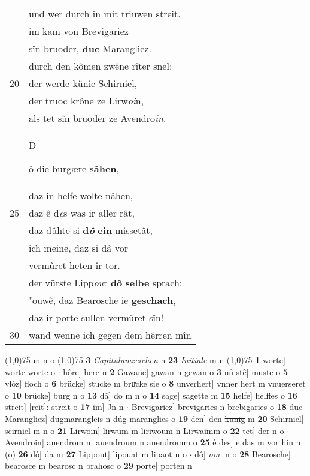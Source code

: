 \documentclass[8pt,a4paper,notitlepage]{article}
\begin{document}
\begin{table}[ht]
\begin{minipage}[t]{0.5\linewidth}
\begin{tabular}{rl}
 & und wer durch in mit triuwen streit.\\ 
 & im kam von Brevigariez\\ 
 & sîn bruoder, \textbf{duc} Marangliez.\\ 
 & durch den kômen zwêne rîter snel:\\ 
20 & der werde künic Schirniel,\\ 
 & der truoc krône ze Lirw\textit{oi}n,\\ 
 & als tet sîn bruoder ze Avendro\textit{in}.\\ 
 & \begin{large}D\end{large}ô die burgære \textbf{sâhen},\\ 
 & daz in helfe wolte nâhen,\\ 
25 & daz ê d\textit{e}s was ir aller rât,\\ 
 & daz dûhte si \textbf{d\textit{ô}} \textbf{ein} missetât,\\ 
 & ich meine, daz si dâ vor\\ 
 & vermûret heten ir tor.\\ 
 & der vürste Lipp\textit{ou}t \textbf{dô} \textbf{selbe} sprach:\\ 
 & "ouwê, daz Bearosche ie \textbf{geschach},\\ 
 & daz ir porte sullen vermûret sîn!\\ 
30 & wand wenne ich gegen dem hêrren mîn\\ 
\end{tabular}
\scriptsize
\line(1,0){75} \newline
m n o \newline
\line(1,0){75} \newline
\textbf{3} \textit{Capitulumzeichen} n  \textbf{23} \textit{Initiale} m n  \newline
\line(1,0){75} \newline
\textbf{1} worte] worte worte o  $\cdot$ hôre] here n \textbf{2} Gawane] gawan n gewan o \textbf{3} nû stê] muste o \textbf{5} vlôz] floch o \textbf{6} brücke] stucke m bruͯcke sie o \textbf{8} unverhert] vnner hert m vnuerseret o \textbf{10} brücke] burg n o \textbf{13} dâ] do m n o \textbf{14} sage] sagette m \textbf{15} helfe] helffes o \textbf{16} streit] [reit]: streit o \textbf{17} im] Jn n  $\cdot$ Brevigariez] brevigaries n brebigaries o \textbf{18} duc Marangliez] dugmarangleis n dúg maranglies o \textbf{19} den] den \sout{kunig} m \textbf{20} Schirniel] scirniel m n o \textbf{21} Lirwoin] lirwum m liriwoum n Lirwaimm o \textbf{22} tet] der n o  $\cdot$ Avendroin] auendrom m auendroum n anendromm o \textbf{25} ê des] e das m vor hin n (o) \textbf{26} dô] da m \textbf{27} Lippout] lipouat m lipaot n o  $\cdot$ dô] \textit{om.} n o \textbf{28} Bearosche] bearosce m bearosc n brahosc o \textbf{29} porte] porten n \newline
\end{minipage}
\end{table}
\end{document}
